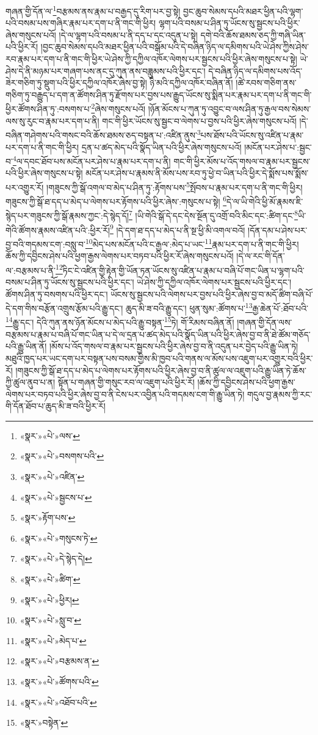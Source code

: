 གཞན་གྱི་དོན་ལ་\footnote{«སྣར་»«པེ་»ལས་}བརྩམས་ནས་རྣམ་པ་བརྒྱད་དུ་རིག་པར་བྱ་སྟེ། བྱང་ཆུབ་སེམས་དཔའི་མཐར་ཕྱིན་པའི་ལྷག་པའི་བསམ་པས་གཞིར་རྣམ་པར་དག་པ་ནི་གང་གི་ཕྱིར། ལྷག་པའི་བསམ་པ་ཤིན་ཏུ་ཡོངས་སུ་སྦྱངས་པའི་ཕྱིར་ཞེས་གསུངས་པའོ། །དེ་ལ་ལྷག་པའི་བསམ་པ་ནི་དད་པ་དང་འདུན་པ་སྟེ། དགེ་བའི་ཆོས་ཐམས་ཅད་ཀྱི་གཞི་ཡིན་པའི་ཕྱིར་རོ། །བྱང་ཆུབ་སེམས་དཔའི་མཐར་ཕྱིན་པའི་བསྒོམ་པའི་དེ་བཞིན་ཉིད་ལ་དམིགས་པའི་ཡེ་ཤེས་ཀྱིས་ཤེས་རབ་རྣམ་པར་དག་པ་ནི་གང་གི་ཕྱིར་ཡེ་ཤེས་ཀྱི་དཀྱིལ་འཁོར་ལེགས་པར་སྦྱངས་པའི་ཕྱིར་ཞེས་གསུངས་པ་སྟེ། ཡེ་ཤེས་དེ་ནི་མཉམ་པར་གཞག་པས་ནང་དུ་ཀུན་ནས་བཟླུམས་པའི་ཕྱིར་དང་། དེ་བཞིན་ཉིད་ལ་དམིགས་པས་འོད་ཟེར་གཅིག་ཏུ་སྡུག་པའི་ཕྱིར་དཀྱིལ་འཁོར་ཞེས་བྱ་སྟེ། ཉི་མའི་དཀྱིལ་འཁོར་བཞིན་ནོ། །ཚེ་རབས་གཅིག་ནས་གཅིག་ཏུ་བརྒྱུད་པ་དག་ན་ཚོགས་ཤིན་ཏུ་རྫོགས་པར་བྱས་པས་རྒྱུད་ཡོངས་སུ་སྨིན་པར་རྣམ་པར་དག་པ་ནི་གང་གི་ཕྱིར་ཚོགས་ཤིན་ཏུ་:བསགས་པ་\footnote{«སྣར་»«པེ་»བསགས་པའི་}ཞེས་གསུངས་པའོ། །ཉོན་མོངས་པ་ཀུན་ཏུ་འབྱུང་བ་ལས་ཤིན་ཏུ་རྒྱལ་བས་སེམས་ལས་སུ་རུང་བ་རྣམ་པར་དག་པ་ནི། གང་གི་ཕྱིར་ཡོངས་སུ་སྦྱང་བ་ལེགས་པ་བྱས་པའི་ཕྱིར་ཞེས་གསུངས་པའོ། །དེ་བཞིན་གཤེགས་པའི་གསང་བའི་ཆོས་ཐམས་ཅད་བསྟན་པ་:འཛིན་ནུས་\footnote{«སྣར་»«པེ་»འཛིན་}པས་ཐོས་པའི་ཡོངས་སུ་འཛིན་པ་རྣམ་པར་དག་པ་ནི་གང་གི་ཕྱིར། དྲན་པ་ཚད་མེད་པའི་སྣོད་ཡིན་པའི་ཕྱིར་ཞེས་གསུངས་པའོ། །མངོན་པར་ཤེས་པ་:སྦྱང་བ་\footnote{«སྣར་»«པེ་»སྦྱངས་པ་}ལ་དབང་ཐོབ་པས་མངོན་པར་ཤེས་པ་རྣམ་པར་དག་པ་ནི། གང་གི་ཕྱིར་མོས་པ་འོད་གསལ་བ་རྣམ་པར་སྦྱངས་པའི་ཕྱིར་ཞེས་གསུངས་པ་སྟེ། མངོན་པར་ཤེས་པ་རྣམས་ནི་མོས་པས་རབ་ཏུ་ཕྱེ་བ་ཡིན་པའི་ཕྱིར་དེ་སྨོས་པས་སྨོས་པར་འགྱུར་རོ། །གཟུངས་ཀྱི་སྒོ་འགལ་བ་མེད་པ་ཤིན་ཏུ་:རྟོགས་པས་\footnote{«སྣར་»རྟོག་པས་}སྤོབས་པ་རྣམ་པར་དག་པ་ནི་གང་གི་ཕྱིར། གཟུངས་ཀྱི་སྒོ་ཐ་དད་པ་མེད་པ་ལེགས་པར་རྟོགས་པའི་ཕྱིར་ཞེས་:གསུངས་པ་སྟེ། \footnote{«སྣར་»«པེ་»གསུངས་ཏེ་}དེ་ལ་ཡི་གེའི་ཕྱི་མོ་རྣམས་ཇི་སྙེད་པར་གཟུངས་ཀྱི་སྒོ་རྣམས་ཀྱང་:དེ་སྙེད་དོ།\footnote{«སྣར་»«པེ་»དེ་སྙེད་དེ།} །ཡི་གེའི་སྒོ་དེ་དང་དེས་སྔོན་དུ་འགྲོ་བའི་མིང་དང་:ཚིག་དང་\footnote{«སྣར་»«པེ་»ཚིག་}ཡི་གེའི་ཚོགས་རྣམས་འཛིན་པའི་:ཕྱིར་རོ།\footnote{«སྣར་»«པེ་»ཕྱིར།} །དེ་དག་ཐ་དད་པ་མེད་པ་ནི་སྔ་ཕྱི་མི་འགལ་བའོ། །དོན་དམ་པ་ཤེས་པར་བྱ་བའི་གདམས་ངག་:བསླུ་བ་\footnote{«སྣར་»«པེ་»སླུ་བ་}མེད་པས་མངོན་པའི་ང་རྒྱལ་:མེད་པ་ཡང་\footnote{«སྣར་»«པེ་»མེད་པ་}རྣམ་པར་དག་པ་ནི་གང་གི་ཕྱིར། ཆོས་ཀྱི་དབྱིངས་ཤེས་པའི་ཕྱག་རྒྱས་ལེགས་པར་བཏབ་པའི་ཕྱིར་རོ་ཞེས་གསུངས་པའོ། །དེ་ལ་རང་གི་དོན་ལ་:བརྩམས་པ་ནི་\footnote{«སྣར་»«པེ་»བརྩམས་ན་}ཏིང་ངེ་འཛིན་གྱི་རྟེན་གྱི་ཡོན་ཏན་ཡོངས་སུ་འཛིན་པ་རྣམ་པ་བཞི་པོ་གང་ཡིན་པ་ལྷག་པའི་བསམ་པ་ཤིན་ཏུ་ཡོངས་སུ་སྦྱངས་པའི་ཕྱིར་དང་། ཡེ་ཤེས་ཀྱི་དཀྱིལ་འཁོར་ལེགས་པར་སྦྱངས་པའི་ཕྱིར་དང་། ཚོགས་ཤིན་ཏུ་བསགས་པའི་ཕྱིར་དང་། ཡོངས་སུ་སྦྱངས་པའི་ལེགས་པར་བྱས་པའི་ཕྱིར་ཞེས་བྱ་བ་མདོ་ཚིག་བཞི་པོ་དེ་དག་གིས་བརྩོན་འགྲུས་རྩོམ་པའི་རྒྱུ་དང་། ཆུད་མི་ཟ་བའི་རྒྱུ་དང་། ཕུན་སུམ་:ཚོགས་པ་\footnote{«སྣར་»«པེ་»ཚོགས་པའི་}རྒྱ་ཆེན་པོ་:ཐོབ་པའི་\footnote{«སྣར་»«པེ་»འཐོབ་པའི་}རྒྱུ་དང་། དེའི་ཀུན་ནས་ཉོན་མོངས་པ་མེད་པའི་རྒྱུ་བསྟན་\footnote{«སྣར་»བསྟེན་}ཏེ། གོ་རིམས་བཞིན་ནོ། །གཞན་གྱི་དོན་ལས་བརྩམས་པ་རྣམ་པ་བཞི་པོ་གང་ཡིན་པ་དེ་ལ་དྲན་པ་ཚད་མེད་པའི་སྣོད་ཡིན་པའི་ཕྱིར་ཞེས་བྱ་བ་ནི་ཐེ་ཚོམ་གཅོད་པའི་རྒྱུ་ཡིན་ནོ། །མོས་པ་འོད་གསལ་བ་རྣམ་པར་སྦྱངས་པའི་ཕྱིར་ཞེས་བྱ་བ་ནི་འདུན་པར་བྱེད་པའི་རྒྱུ་ཡིན་ཏེ། མཐུའི་ཁྱད་པར་ཡང་དག་པར་བསྟན་པས་བསམ་གྱིས་མི་ཁྱབ་པའི་གནས་ལ་མོས་པས་འཇུག་པར་འགྱུར་བའི་ཕྱིར་རོ། །གཟུངས་ཀྱི་སྒོ་ཐ་དད་པ་མེད་པ་ལེགས་པར་རྟོགས་པའི་ཕྱིར་ཞེས་བྱ་བ་ནི་ཚུལ་ལ་འཇུག་པའི་རྒྱུ་ཡིན་ཏེ་ཆོས་ཀྱི་ཚུལ་ནུབ་པ་ན། སྟོན་པ་གཞན་གྱི་གསུང་རབ་ལ་འཇུག་པའི་ཕྱིར་རོ། །ཆོས་ཀྱི་དབྱིངས་ཤེས་པའི་ཕྱག་རྒྱས་ལེགས་པར་བཏབ་པའི་ཕྱིར་ཞེས་བྱ་བ་ནི་ངེས་པར་འབྱིན་པའི་གདམས་ངག་གི་རྒྱུ་ཡིན་ཏེ། གདུལ་བྱ་རྣམས་ཀྱི་རང་གི་དོན་ཐོབ་པ་ཆུད་མི་ཟ་བའི་ཕྱིར་རོ། 